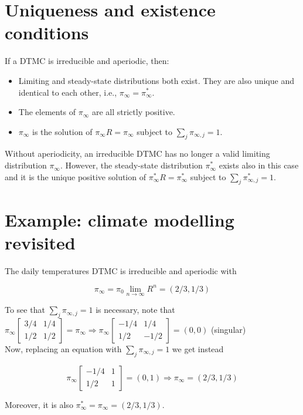 \documentclass[10pt]{article}
\begin{document}
\section*{Uniqueness and existence conditions}
If a DTMC is irreducible and aperiodic, then:

\begin{itemize}
  \item Limiting and steady-state distributions both exist. They are also unique and identical to each other, i.e., $\pi_{\infty}=\pi_{\infty}^{*}$.
  \item The elements of $\pi_{\infty}$ are all strictly positive.
  \item $\pi_{\infty}$ is the solution of $\pi_{\infty} R=\pi_{\infty}$ subject to $\sum_{j} \pi_{\infty, j}=1$.
\end{itemize}

Without aperiodicity, an irreducible DTMC has no longer a valid limiting distribution $\pi_{\infty}$. However, the steady-state distribution $\pi_{\infty}^{*}$ exists also in this case and it is the unique positive solution of $\pi_{\infty}^{*} R=\pi_{\infty}^{*}$ subject to $\sum_{j} \pi_{\infty, j}^{*}=1$.

\section*{Example: climate modelling revisited}
The daily temperatures DTMC is irreducible and aperiodic with

$$
\pi_{\infty}=\pi_{0} \lim _{n \rightarrow \infty} R^{n}=(2 / 3,1 / 3)
$$

To see that $\sum_{j} \pi_{\infty, j}=1$ is necessary, note that\\
$\pi_{\infty}\left[\begin{array}{cc}3 / 4 & 1 / 4 \\ 1 / 2 & 1 / 2\end{array}\right]=\pi_{\infty} \Rightarrow \pi_{\infty}\left[\begin{array}{cc}-1 / 4 & 1 / 4 \\ 1 / 2 & -1 / 2\end{array}\right]=(0,0)$ (singular)\\
Now, replacing an equation with $\sum_{j} \pi_{\infty, j}=1$ we get instead

$$
\pi_{\infty}\left[\begin{array}{cc}
-1 / 4 & 1 \\
1 / 2 & 1
\end{array}\right]=(0,1) \Rightarrow \pi_{\infty}=(2 / 3,1 / 3)
$$

Moreover, it is also $\pi_{\infty}^{*}=\pi_{\infty}=(2 / 3,1 / 3)$.
\end{document}
